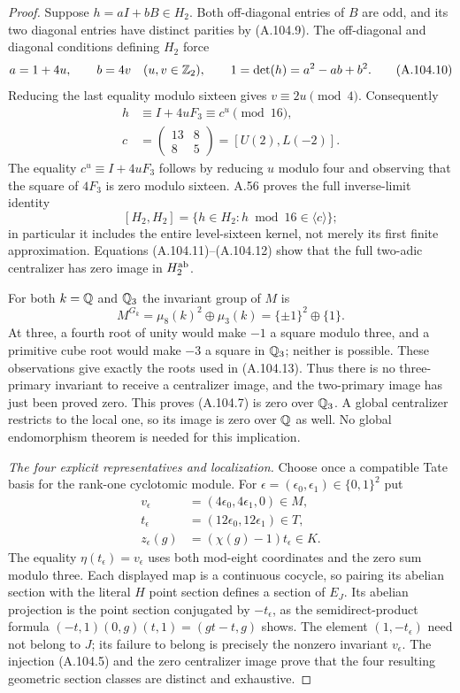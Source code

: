 \begin{proof}
Suppose $h=aI+bB\in H_2$.
Both off-diagonal entries of $B$ are odd,
and its two diagonal entries have distinct
parities by (A.104.9).
The off-diagonal and diagonal conditions
defining $H_2$ force
\[
        a=1+4u,\qquad b=4v\quad(u,v\in\mathbb Z_2),
              \qquad
        1=\det(h)=a^2-ab+b^2.
\tag{A.104.10}
\]
Reducing the last equality modulo sixteen
gives $v\equiv2u\pmod4$.
Consequently
\[
 \begin{split}
       h&\equiv I+4uF_3\equiv c^u\pmod{16},\\
       c&=\begin{pmatrix}13&8\\8&5\end{pmatrix}
                    =[U(2),L(-2)].
 \end{split}
\tag{A.104.11}
\]
The equality $c^u\equiv I+4uF_3$ follows
by reducing $u$ modulo four and observing
that the square of $4F_3$ is zero modulo
sixteen.
A.56 proves the full inverse-limit
identity
\[
       [H_2,H_2]
            =\{h\in H_2:h\bmod16\in\langle c\rangle\};
\tag{A.104.12}
\]
in particular it includes the entire
level-sixteen kernel, not merely its
first finite approximation.
Equations (A.104.11)--(A.104.12) show that
the full two-adic centralizer has zero
image in $H_2^{\rm ab}$.

For both $k=\mathbb Q$ and $\mathbb Q_3$ the invariant
group of $M$ is
\[
       M^{G_k}=\mu_8(k)^2\oplus\mu_3(k)
                         =\{\pm1\}^2\oplus\{1\}.
\tag{A.104.13}
\]
At three, a fourth root of unity would
make $-1$ a square modulo three, and a
primitive cube root would make $-3$
a square in $\mathbb Q_3$; neither is possible.
These observations give exactly the
roots used in (A.104.13).
Thus there is no three-primary invariant
to receive a centralizer image, and
the two-primary image has just been
proved zero.
This proves (A.104.7) is zero over
$\mathbb Q_3$.  A global centralizer restricts
to the local one, so its image is zero
over $\mathbb Q$ as well.
No global endomorphism theorem is needed
for this implication.

\emph{The four explicit representatives and localization.}
Choose once a compatible Tate basis for
the rank-one cyclotomic module.
For $\epsilon=(\epsilon_0,\epsilon_1)\in\{0,1\}^2$ put
\[
 \begin{split}
       v_\epsilon&=(4\epsilon_0,4\epsilon_1,0)\in M,\\
       t_\epsilon&=(12\epsilon_0,12\epsilon_1)\in T,\\
       z_\epsilon(g)&=(\chi(g)-1)t_\epsilon\in K.
 \end{split}
\tag{A.104.14}
\]
The equality $\eta(t_\epsilon)=v_\epsilon$
uses both mod-eight coordinates and the
zero sum modulo three.
Each displayed map is a continuous
cocycle, so pairing its abelian section
with the literal $H$ point section
defines a section of $E_J$.
Its abelian projection is the point
section conjugated by $-t_\epsilon$,
as the semidirect-product formula
$(-t,1)(0,g)(t,1)=(g t-t,g)$ shows.
The element $(1,-t_\epsilon)$ need not
belong to $J$; its failure to belong
is precisely the nonzero invariant
$v_\epsilon$.
The injection (A.104.5) and the zero
centralizer image prove that the four
resulting geometric section classes
are distinct and exhaustive.


\end{proof}

